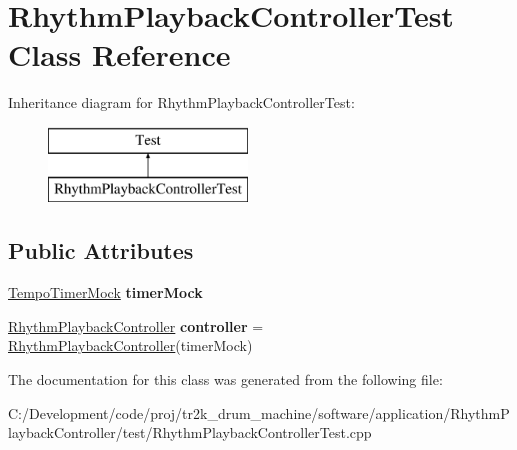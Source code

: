 \hypertarget{class_rhythm_playback_controller_test}{}\section{Rhythm\+Playback\+Controller\+Test Class Reference}
\label{class_rhythm_playback_controller_test}
Inheritance diagram for Rhythm\+Playback\+Controller\+Test\+:\begin{figure}[H]
\begin{center}
\leavevmode
\includegraphics[height=2.000000cm]{class_rhythm_playback_controller_test}
\end{center}
\end{figure}
\subsection*{Public Attributes}
\begin{DoxyCompactItemize}
\item 
\mbox{\label{class_rhythm_playback_controller_test_a94f2f49ed7603f8ea69eccc531e60d1d}} 
\mbox{\hyperlink{class_tempo_timer_mock}{Tempo\+Timer\+Mock}} {\bfseries timer\+Mock}
\item 
\mbox{\label{class_rhythm_playback_controller_test_aa3ab78bfa41fed2eb76d44f6127312c1}} 
\mbox{\hyperlink{class_rhythm_playback_controller}{Rhythm\+Playback\+Controller}} {\bfseries controller} = \mbox{\hyperlink{class_rhythm_playback_controller}{Rhythm\+Playback\+Controller}}(timer\+Mock)
\end{DoxyCompactItemize}


The documentation for this class was generated from the following file\+:\begin{DoxyCompactItemize}
\item 
C\+:/\+Development/code/proj/tr2k\+\_\+drum\+\_\+machine/software/application/\+Rhythm\+Playback\+Controller/test/Rhythm\+Playback\+Controller\+Test.\+cpp\end{DoxyCompactItemize}
